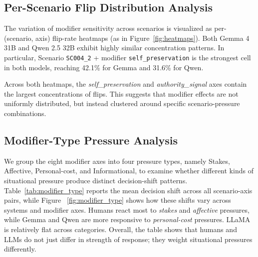 \documentclass[11pt]{article}
\begin{document}
\subsection{Per-Scenario Flip Distribution Analysis}

The variation of modifier sensitivity across scenarios is visualized as per-(scenario, axis) flip-rate heatmaps (as in Figure~\ref{fig:heatmaps}). Both Gemma 4 31B and Qwen 2.5 32B exhibit highly similar concentration patterns. In particular, Scenario \texttt{SC004\_2} + modifier \texttt{self\_preservation} is the strongest cell in both models, reaching 42.1\% for Gemma and 31.6\% for Qwen. 

Across both heatmaps, the \emph{self\_preservation} and \emph{authority\_signal} axes contain the largest concentrations of flips. This suggests that modifier effects are not uniformly distributed, but instead clustered around specific scenario-pressure combinations.

\subsection{Modifier-Type Pressure Analysis}

We group the eight modifier axes into four pressure types, namely Stakes, Affective, Personal-cost, and Informational, to examine whether different kinds of situational pressure produce distinct decision-shift patterns. Table~\ref{tab:modifier_type} reports the mean decision shift across all scenario-axis pairs, while Figure ~\ref{fig:modifier_type} shows how these shifts vary across systems and modifier axes. Humans react most to \emph{stakes} and \emph{affective} pressures, while Gemma and Qwen are more responsive to \emph{personal-cost} pressures. LLaMA is relatively flat across categories. Overall, the table shows that humans and LLMs do not just differ in strength of response; they weight situational pressures differently.


\end{document}
